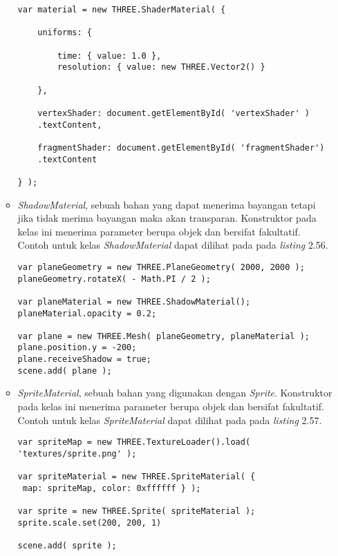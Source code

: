 \begin{itemize}
\begin{itemize}
\begin{lstlisting}[caption={Contoh penggunaan kelas {\it ShaderMaterial}.},captionpos=b]
var material = new THREE.ShaderMaterial( {

	uniforms: {

		time: { value: 1.0 },
		resolution: { value: new THREE.Vector2() }

	},

	vertexShader: document.getElementById( 'vertexShader' )
	.textContent,

	fragmentShader: document.getElementById( 'fragmentShader')
	.textContent

} );
\end{lstlisting}

	\item {\it ShadowMaterial}, sebuah bahan yang dapat menerima bayangan tetapi jika tidak merima bayangan maka akan transparan. Konstruktor pada kelas ini menerima parameter berupa objek dan bersifat fakultatif. Contoh untuk kelas {\it ShadowMaterial} dapat dilihat pada pada {\it listing} 2.56.
	
\begin{lstlisting}[caption={Contoh penggunaan kelas {\it ShadowMaterial}.},captionpos=b]
var planeGeometry = new THREE.PlaneGeometry( 2000, 2000 );
planeGeometry.rotateX( - Math.PI / 2 );

var planeMaterial = new THREE.ShadowMaterial();
planeMaterial.opacity = 0.2;

var plane = new THREE.Mesh( planeGeometry, planeMaterial );
plane.position.y = -200;
plane.receiveShadow = true;
scene.add( plane );
\end{lstlisting}

	\item {\it SpriteMaterial}, sebuah bahan yang digunakan dengan {\it Sprite}. Konstruktor pada kelas ini menerima parameter berupa objek dan bersifat fakultatif. Contoh untuk kelas {\it SpriteMaterial} dapat dilihat pada pada {\it listing} 2.57.
	
\begin{lstlisting}[caption={Contoh penggunaan kelas {\it SpriteMaterial}.},captionpos=b]
var spriteMap = new THREE.TextureLoader().load( 'textures/sprite.png' );

var spriteMaterial = new THREE.SpriteMaterial( {
 map: spriteMap, color: 0xffffff } );

var sprite = new THREE.Sprite( spriteMaterial );
sprite.scale.set(200, 200, 1)

scene.add( sprite );
\end{lstlisting}


\end{itemize}
\end{itemize}
